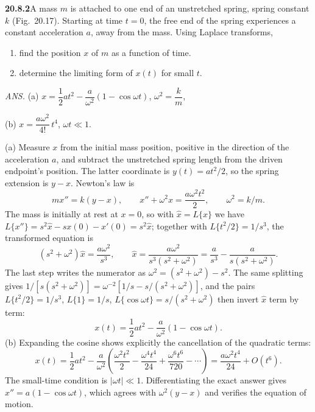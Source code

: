 \par\bigskip
\noindent\textbf{20.8.2}\quad A mass $m$ is attached to one end of
an unstretched spring, spring constant $k$ (Fig.~20.17). Starting
at time $t=0$, the free end of the spring experiences a constant
acceleration $a$, away from the mass. Using Laplace transforms,
\begin{enumerate}
\item[(a)] find the position $x$ of $m$ as a function of time.
\item[(b)] determine the limiting form of $x(t)$ for small $t$.
\end{enumerate}
\par\nobreak\hfill\emph{ANS.}\enspace
(a) $x=\dfrac{1}{2}at^{2}-\dfrac{a}{\omega^{2}}(1-\cos\omega t)$,
$\omega^{2}=\dfrac{k}{m}$,\par\nobreak\hfill
(b) $x=\dfrac{a\omega^{2}}{4!}\,t^{4}$, $\omega t\ll1$.
\par{}
\solution
(a) Measure $x$ from the initial mass position, positive in
the direction of the acceleration $a$, and subtract
the unstretched spring length from the driven endpoint's
position. The latter coordinate is $y(t)=at^2/2$, so the spring
extension is $y-x$. Newton's law is
\[
m x''=k(y-x),\qquad
x''+\omega^2x=\frac{a\omega^2t^2}{2},\qquad \omega^2=k/m.
\]
The mass is initially at rest at $x=0$, so with
$\widehat x=L\{x\}$ we have
$L\{x''\}=s^2\widehat x-sx(0)-x'(0)=s^2\widehat x$; together
with $L\{t^2/2\}=1/s^3$, the transformed equation is
\[
(s^2+\omega^2)\widehat x=\frac{a\omega^2}{s^3},\qquad
\widehat x=\frac{a\omega^2}{s^3(s^2+\omega^2)}
=\frac a{s^3}-\frac a{s(s^2+\omega^2)}.
\]
The last step writes the numerator as
$\omega^2=(s^2+\omega^2)-s^2$. The same splitting gives
$1/[s(s^2+\omega^2)]=\omega^{-2}[1/s-s/(s^2+\omega^2)]$, and
the pairs $L\{t^2/2\}=1/s^3$, $L\{1\}=1/s$,
$L\{\cos\omega t\}=s/(s^2+\omega^2)$ then invert $\widehat x$
term by term:
\[
\boxed{x(t)=\frac12at^2-\frac a{\omega^2}(1-\cos\omega t)}.
\]
(b) Expanding the cosine shows explicitly the cancellation of the
quadratic terms:
\[
x(t)=\frac12at^2-\frac a{\omega^2}
\left(\frac{\omega^2t^2}{2}-\frac{\omega^4t^4}{24}
+\frac{\omega^6t^6}{720}-\cdots\right)
=\boxed{\frac{a\omega^2t^4}{24}+O(t^6)}.
\]
The small-time condition is $|\omega t|\ll1$. Differentiating
the exact answer gives $x''=a(1-\cos\omega t)$, which agrees
with $\omega^2(y-x)$ and verifies the equation of motion.

